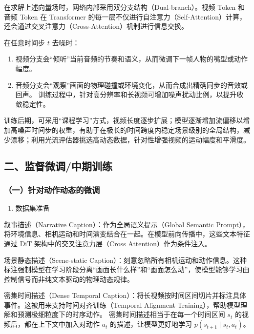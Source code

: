在求解上述向量场时，网络内部采用双分支结构（Dual-branch）。视频 Token 和音频 Token 在 Transformer 的每一层不仅进行自注意力（Self-Attention）计算，还会通过交叉注意力（Cross-Attention）机制进行信息交换。

在任意时间步 \(t\) 去噪时：

\begin{enumerate}
\def\labelenumi{\arabic{enumi}.}
\item
  视频分支会``倾听''当前音频的节奏和语义，从而微调下一帧人物的嘴型或动作幅度。
\item
  音频分支会``观察''画面的物理碰撞或环境变化，从而合成出精确同步的音效或回声。
  训练过程中，针对高分辨率和长视频可增加噪声扰动比例，以提升收敛稳定性。
\end{enumerate}

训练后期，可采用``课程学习''方式，视频长度逐步扩展；模型逐渐增加流偏移以增加高噪声时间步的权重，有助于在极长的时间跨度内稳定场景级别的全局结构，减少漂移；利用光流评估器挑选高动态数据，针对性增强视频的运动幅度和平滑度。

\hypertarget{ux4e8cux76d1ux7763ux5faeux8c03ux4e2dux671fux8badux7ec3}{%
\subsection{二、监督微调/中期训练}\label{ux4e8cux76d1ux7763ux5faeux8c03ux4e2dux671fux8badux7ec3}}

\hypertarget{ux4e00ux9488ux5bf9ux52a8ux4f5cux52a8ux6001ux7684ux5faeux8c03}{%
\subsubsection{（一）针对动作动态的微调}\label{ux4e00ux9488ux5bf9ux52a8ux4f5cux52a8ux6001ux7684ux5faeux8c03}}

\begin{enumerate}
\def\labelenumi{\arabic{enumi}.}
\tightlist
\item
  数据集准备
\end{enumerate}

叙事描述（Narrative Caption）：作为全局语义提示（Global Semantic Prompt），将环境信息、相机运动和时间演变结合在一起。在模型前向传播中，这些文本特征通过 DiT 架构中的交叉注意力层（Cross Attention）作为条件注入。

场景静态描述（Scene-static Caption）：刻意忽略所有相机运动和动作信息。这种标注强制模型在学习阶段分离``画面长什么样''和``画面怎么动''，使模型能够学习由控制信号而非纯文本驱动的物理动态规律。

密集时间描述（Dense Temporal Caption）：将长视频按时间区间切片并标注具体事件。这被用来支持时间对齐训练（Temporal Alignment Training），帮助模型理解和预测极细粒度下的时序动作。
密集时间描述相当于在每一个时间区间 \(s_t\) 的视频后，都在上下文中加入对动作 \(a_t\) 的描述，让模型更好地学习 \(p(s_{t+1}\mid s_t,a_t)\)。

